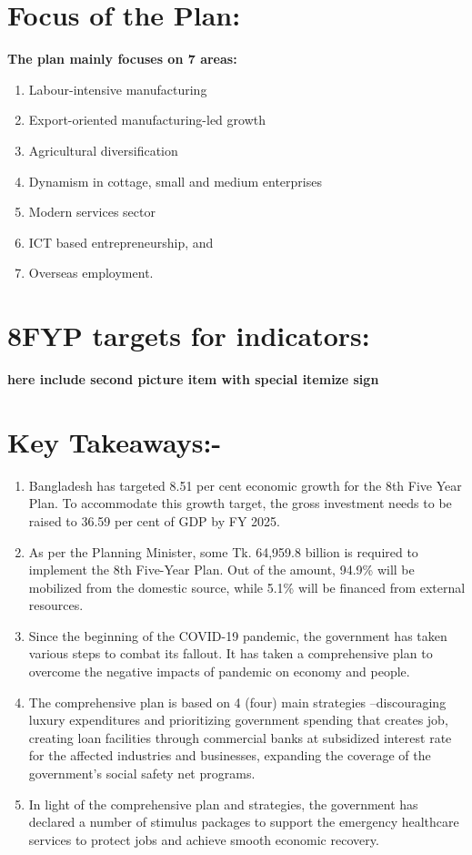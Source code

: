\documentclass[a4paper,12pt]{book}
\begin{document}
\section{Focus of the Plan:}
\textbf{The plan mainly focuses on 7 areas:}
\begin{enumerate}
    \item Labour-intensive manufacturing
\item Export-oriented manufacturing-led growth
\item Agricultural diversification
\item Dynamism in cottage, small and medium enterprises
\item Modern services sector
\item ICT based entrepreneurship, and
\item Overseas employment.
\end{enumerate}

\section{8FYP targets for indicators:}
\textbf{\textbf{\textbf{here include second picture item with special itemize sign}}}

\section{Key Takeaways:-}
\begin{enumerate}
    \item Bangladesh has targeted 8.51 per cent economic growth for the 8th Five Year Plan. To accommodate this growth target, the gross investment needs to be raised to 36.59 per cent of GDP by FY 2025.
    \item As per the Planning Minister, some Tk. 64,959.8 billion is required to implement the 8th Five-Year Plan. Out of the amount, 94.9\% will be mobilized from the domestic source, while 5.1\% will be financed from external resources.
\item Since the beginning of the COVID-19 pandemic, the government has taken various steps to combat its fallout. It has taken a comprehensive plan to overcome the negative impacts of pandemic on economy and people.
\item The comprehensive plan is based on 4 (four) main strategies --discouraging luxury expenditures and prioritizing government spending that creates job, creating loan facilities through commercial banks at subsidized interest rate for the affected industries and businesses, expanding the coverage of the
government’s social safety net programs.
\item In light of the comprehensive plan and strategies, the government has declared a number of stimulus packages to support the emergency healthcare services to protect jobs and achieve smooth economic recovery.
\end{enumerate}
\end{document}
